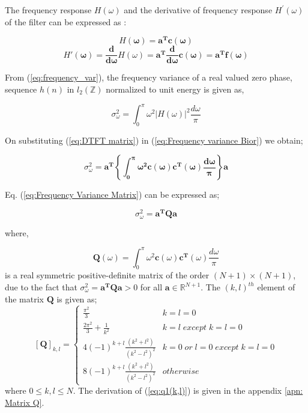 The frequency response $H(\omega)$ and the derivative of frequency response
$H^{'}(\omega)$ of the filter can be expressed as :

\begin{equation}
H\mathbf{(\omega)=a^{T}c(\omega)}\label{eq:DTFT matrix}\end{equation}
\begin{equation}
H\mathbf{'(\omega)=\frac{d}{d\omega}}H(\omega)\mathbf{=a^{T}\frac{d}{d\omega}c(\omega)=a^{\mathbf{T}}}\mathbf{f(\omega)}\label{eq:Derivative DTFT}\end{equation}

From (\ref{eq:frequency_var}), the frequency variance of a real valued zero
phase, sequence $h(n)$ in $l_{2}(\mathbb{Z})$ normalized to unit
energy is given as,

\begin{equation}
\label{eq:Frequency variance Bior}
\sigma_{\omega}^{2}=\int_{0}^{\pi}\omega^{2}|H(\omega)|^{2}\frac{d\omega}{\pi}
\end{equation}


On substituting (\ref{eq:DTFT matrix}) in (\ref{eq:Frequency variance Bior})
we obtain;

\begin{equation}
\sigma_{\omega}^{2}=\mathbf{a^{T}\left\{ \int_{0}^{\pi}\omega^{2}c(\omega)c^{T}(\omega)\frac{d\omega}{\pi}\right\} a}\label{eq:Frequency Variance Matrix}\end{equation}


Eq. (\ref{eq:Frequency Variance Matrix}) can be expressed as;

\begin{equation}
\sigma_{\omega}^{2}=\mathbf{a^{T}}\mathbf{Q}\mathbf{a}\label{eq:FrequencyVarianceMatrixForm}\end{equation}


where,

\begin{equation}
\mathbf{Q}(\omega)=\int_{0}^{\pi}\omega^{2}\mathbf{c}(\omega)\mathbf{c}^{\mathbf{T}}(\omega)\frac{d\omega}{\pi}\label{eq:MatrixFrequencyVariance}\end{equation}
 is a real symmetric positive-definite matrix of the order $(N+1)\times(N+1)$, due to the fact that $\sigma_{\omega}^{2}=\mathbf{a^{T}Qa>} 0$ for all $\mathbf{a}\in\mathbb{R}^{N+1}$. The $(k,l)^{th}$ element of the matrix $\mathbf{Q}$ is given as;
\begin{equation}
\label{eq:q1(k,l)}
[\mathbf{Q}]_{k,l}=\begin{cases}
\frac{\pi^{2}}{3} & k=l=0\\
\frac{2 \pi ^{2}}{3}+\frac{1}{k^2} & k=l\; except\; k=l=0\\
4(-1)^{k+l}\frac{(k^{2}+l^{2})}{(k^{2}-l^{2})^{2}} & k=0\; or\; l=0\; except\; k=l=0\\
8(-1)^{k+l}\frac{(k^{2}+l^{2})}{(k^{2}-l^{2})^{2}} & otherwise
\end{cases}
\end{equation}
where $0\le k,l\le N$.
The derivation of (\ref{eq:q1(k,l)}) is given in the appendix \ref{apn: Matrix Q}.

